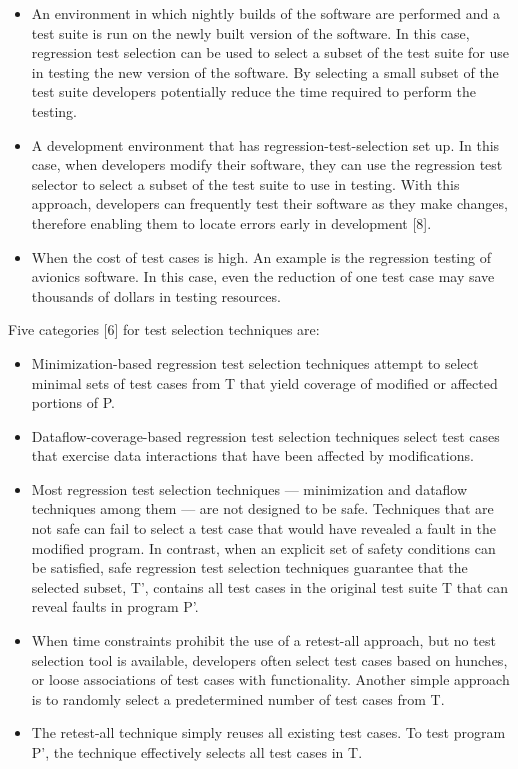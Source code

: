\begin{itemize}
\item An environment in which nightly builds of the software are performed and a test suite is run on the newly built version of the software. In this case, regression test selection can be used to select a subset of the test suite for use in testing the new version of the software. By selecting a small subset of the test suite developers potentially reduce the time required to perform the testing.
\item A development environment that has regression-test-selection set up. In this case, when developers modify their software, they can use the regression test selector to select a subset of the test suite to use in testing. With this approach, developers can frequently test their software as they make changes, therefore enabling them to locate errors early in development [8].
\item When the cost of test cases is high. An example is the regression testing of avionics software. In this case, even the reduction of one test case may save thousands of dollars in testing resources.
\end{itemize}

Five categories [6] for test selection techniques are:
\begin{itemize}
\item Minimization-based regression test selection techniques attempt to select minimal sets of test cases from T that yield coverage of modified or affected portions of P.
\item Dataflow-coverage-based regression test selection techniques select test cases that exercise data interactions that have been affected by modifications.
\item Most regression test selection techniques --- minimization and dataflow techniques among them --- are not designed to be safe. Techniques that are not safe can fail to select a test case that would have revealed a fault in the modified program. In contrast, when an explicit set of safety conditions can be satisfied, safe regression test selection techniques guarantee that the selected subset, T', contains all test cases in the original test suite T that can reveal faults in program P'.
\item When time constraints prohibit the use of a retest-all approach, but no test selection tool is available, developers often select test cases based on hunches, or loose associations of test cases with functionality. Another simple approach is to randomly select a predetermined number of test cases from T.
\item The retest-all technique simply reuses all existing test cases. To test program P', the technique effectively selects all test cases in T.
\end{itemize}
